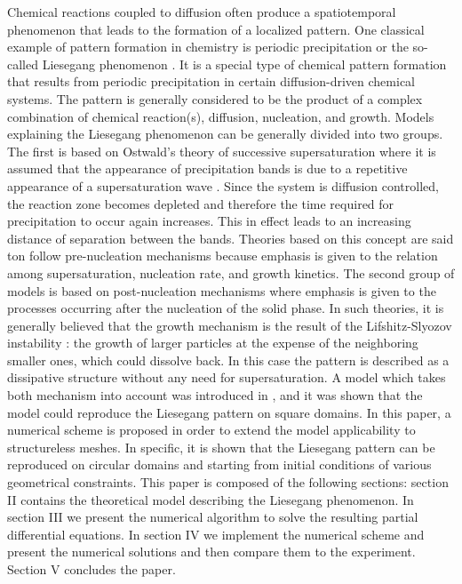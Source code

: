 \documentclass[aps,preprint]{revtex4}
\begin{document}
Chemical reactions coupled to diffusion often produce a spatiotemporal
phenomenon that leads to the formation of a localized pattern. One classical
example of pattern formation in chemistry is periodic precipitation or the
so-called Liesegang phenomenon \cite{Chemische,Crystals,CoOH,Electric}. It is
a special type of chemical pattern formation that results from periodic
precipitation in certain diffusion-driven chemical systems. The pattern is
generally considered to be the product of a complex combination of chemical
reaction(s), diffusion, nucleation, and growth. Models explaining the
Liesegang phenomenon can be generally divided into two groups. The first is
based on Ostwald's theory of successive supersaturation where it is assumed
that the appearance of precipitation bands is due to a repetitive appearance
of a supersaturation wave \cite{Ostwald}. Since the system is diffusion
controlled, the reaction zone becomes depleted and therefore the time required
for precipitation to occur again increases. This in effect leads to an
increasing distance of separation between the bands. Theories based on this
concept are said ton follow pre-nucleation mechanisms because emphasis is
given to the relation among supersaturation, nucleation rate, and growth
kinetics. The second group of models is based on post-nucleation mechanisms
where emphasis is given to the processes occurring after the nucleation of the
solid phase. In such theories, it is generally believed that the growth
mechanism is the result of the Lifshitz-Slyozov instability \cite{Lifshitz}:
the growth of larger particles at the expense of the neighboring smaller ones,
which could dissolve back. In this case the pattern is described as a
dissipative structure without any need for supersaturation. A model which
takes both mechanism into account was introduced in \cite{precipitation}, and
it was shown \cite{Muller-Poly} that the model could reproduce the Liesegang
pattern on square domains. In this paper, a numerical scheme is proposed in
order to extend the model applicability to structureless meshes. In specific,
it is shown that the Liesegang pattern can be reproduced on circular domains
and starting from initial conditions of various geometrical constraints. This paper is composed of the following sections: section II contains the theoretical model describing the Liesegang phenomenon. In section III we present the numerical algorithm to solve the resulting partial differential equations. In section IV we implement the numerical scheme and present the numerical solutions and then compare them to the experiment. Section V concludes the paper.
\end{document}

